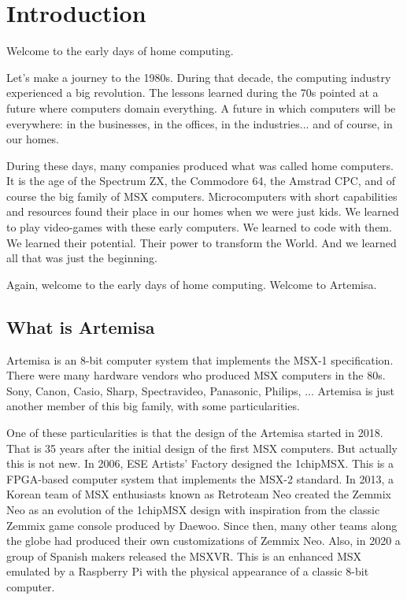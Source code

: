 \chapter{Introduction}

Welcome to the early days of home computing.

Let's make a journey to the 1980s. During that decade, the computing industry experienced a big revolution. The lessons learned during the 70s pointed at a future where computers domain everything. A future in which computers will be everywhere: in the businesses, in the offices, in the industries... and of course, in our homes.

During these days, many companies produced what was called home computers. It is the age of the Spectrum ZX, the Commodore 64, the Amstrad CPC, and of course the big family of MSX computers. Microcomputers with short capabilities and resources found their place in our homes when we were just kids. We learned to play video-games with these early computers. We learned to code with them. We learned their potential. Their power to transform the World. And we learned all that was just the beginning.

Again, welcome to the early days of home computing. Welcome to Artemisa.

\section{What is Artemisa}

Artemisa is an 8-bit computer system that implements the MSX-1 specification. There were many hardware vendors who produced MSX computers in the 80s. Sony, Canon, Casio, Sharp, Spectravideo, Panasonic, Philips, ... Artemisa is just another member of this big family, with some particularities.

One of these particularities is that the design of the Artemisa started in 2018. That is 35 years after the initial design of the first MSX computers. But actually this is  not new. In 2006, ESE Artists’ Factory designed the 1chipMSX. This is a FPGA-based computer system that implements the MSX-2 standard. In 2013, a Korean team of MSX enthusiasts known as Retroteam Neo created the Zemmix Neo as an evolution of the 1chipMSX design with inspiration from the classic Zemmix game console produced by Daewoo. Since then, many other teams along the globe had produced their own customizations of Zemmix Neo. Also, in 2020 a group of Spanish makers released the MSXVR. This is an enhanced MSX emulated by a Raspberry Pi with the physical appearance of a classic 8-bit computer.

